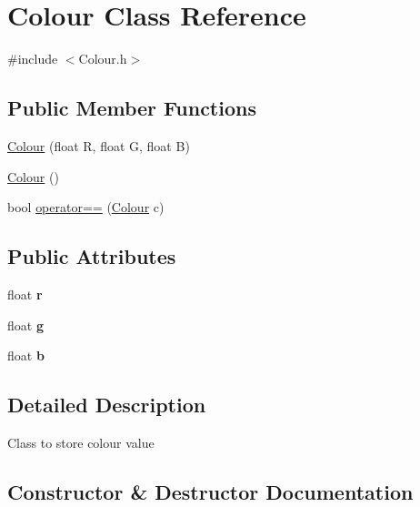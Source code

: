 \hypertarget{classColour}{}\section{Colour Class Reference}
\label{classColour}


{\ttfamily \#include $<$Colour.\+h$>$}

\subsection*{Public Member Functions}
\begin{DoxyCompactItemize}
\item 
\hyperlink{classColour_a15198315afb938e0fe97987c7d67e566}{Colour} (float R, float G, float B)
\item 
\hyperlink{classColour_a46612b9524fcd4cee818af6a86b7a4d2}{Colour} ()
\item 
bool \hyperlink{classColour_a27fe7a1109a5d2af2d3070d6712732ed}{operator==} (\hyperlink{classColour}{Colour} c)
\end{DoxyCompactItemize}
\subsection*{Public Attributes}
\begin{DoxyCompactItemize}
\item 
\mbox{\label{classColour_acb0b39e6e5e18b946732f51f126c8bf8}} 
float {\bfseries r}
\item 
\mbox{\label{classColour_a25bdab33ddd5f646162329bfb8b23b75}} 
float {\bfseries g}
\item 
\mbox{\label{classColour_aee312356ce76f9c54c9beecad919b421}} 
float {\bfseries b}
\end{DoxyCompactItemize}


\subsection{Detailed Description}
Class to store colour value 

\subsection{Constructor \& Destructor Documentation}
\mbox{\label{classColour_a15198315afb938e0fe97987c7d67e566}} 
